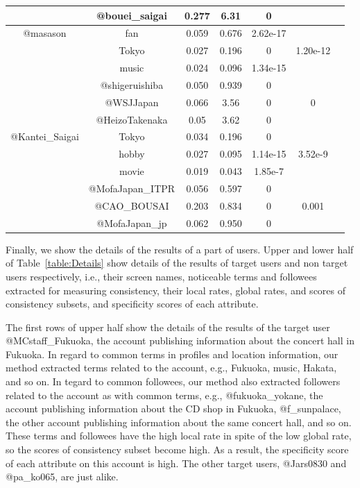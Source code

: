 \begin{table}[p]
\begin{center}
{\begin{tabular}{ccccccc}
 & @bouei\_saigai & 0.277 & 6.31 & 0 & \\ \hline
 @masason & fan & 0.059 & 0.676 & 2.62e-17 \\
 & Tokyo & 0.027 & 0.196 & 0 & 1.20e-12 \\
 & music & 0.024 & 0.096 & 1.34e-15 & \\ \cline{2-7}
 & @shigeruishiba & 0.050 & 0.939 & 0 & \\
 & @WSJJapan & 0.066 & 3.56 & 0 & 0 \\
 & @HeizoTakenaka & 0.05 & 3.62 & 0 & \\ \hline
 @Kantei\_Saigai & Tokyo & 0.034 & 0.196 & 0 & \\
 & hobby & 0.027 & 0.095 & 1.14e-15 & 3.52e-9 \\
 & movie & 0.019 & 0.043 & 1.85e-7 & \\ \cline{2-7}
 & @MofaJapan\_ITPR & 0.056 & 0.597 & 0 & \\
 & @CAO\_BOUSAI & 0.203 & 0.834 & 0 & 0.001 \\
 & @MofaJapan\_jp & 0.062 & 0.950 & 0 & \\ \hline
\end{tabular}
}
\end{center}
\end{table}

Finally, we show the details of the results of a part of users.  Upper
and lower half of Table~\ref{table:Details} show details of the results
of target users and non target users respectively, i.e., their screen
names, noticeable terms and followees extracted for measuring
consistency, their local rates, global rates, and scores of consistency
subsets, and specificity scores of each attribute.

The first rows of upper half show the details of the results of the
target user @MCstaff\_Fukuoka, the account publishing information about
the concert hall in Fukuoka.  In regard to common terms in profiles and
location information, our method extracted terms related to the account,
e.g., Fukuoka, music, Hakata, and so on.  In tegard to common followees,
our method also extracted followers related to the account as with
common terms, e.g., @fukuoka\_yokane, the account publishing information
about the CD shop in Fukuoka, @f\_sunpalace, the other account
publishing information about the same concert hall, and so on.  These
terms and followees have the high local rate in spite of the low global
rate, so the scores of consistency subset become high.  As a result, the
specificity score of each attribute on this account is high.  The other
target users, @Jars0830 and @pa\_ko065, are just alike.

